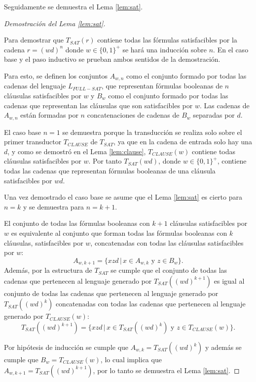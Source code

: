 Seguidamente se demuestra el Lema \ref{lem:sat}.

\begin{proof}[Demostración del Lema \ref{lem:sat}] \
    
    Para demostrar que $T_{SAT}(r)$ contiene todas las fórmulas satisfacibles por la cadena $r=(wd)^n$ donde $w\in\{0,1\}^+$ se hará una inducción sobre $n$. En el caso base y el paso inductivo
    se prueban ambos sentidos de la demostración.  
    
    Para esto, se definen los conjuntos $A_{w,n}$ como el conjunto formado por todas las cadenas del lenguaje $L_{FULL-SAT}$, que representan fórmulas booleanas de $n$ cláusulas satisfacibles por $w$ y $B_w$ como el conjunto formado por todas las cadenas que representan las cláusulas que son satisfacibles por $w$. Las cadenas de $A_{w,n}$ están formadas por $n$ concatenaciones de cadenas de $B_w$ separadas por $d$.
    
    El caso base $n=1$ se demuestra porque la transducción se realiza solo sobre el primer transductor $T_{CLAUSE}$ de $T_{SAT}$, ya que en la cadena de entrada solo hay una $d$, y como se demostró en el Lema \ref{lem:clause}, $T_{CLAUSE}(w)$ contiene todas cláusulas satisfacibles por $w$. Por tanto $T_{SAT}(wd)$, donde $w\in \{0,1\}^+$, contiene todas las cadenas que representan fórmulas booleanas de una cláusula satisfacibles por $wd$.
    
    Una vez demostrado el caso base se asume que el Lema \ref{lem:sat} es cierto para $n=k$ y se demuestra para $n=k+1$.
    
    El conjunto de todas las fórmulas booleanas con $k+1$ cláusulas satisfacibles por $w$ es equivalente al conjunto que forman todas las fórmulas booleanas con $k$ cláusulas, satisfacibles por $w$, concatenadas con todas las cláusulas satisfacibles por $w$: $$A_{w,k+1}=\{xzd\,|\,x\in A_{w,k} \text{ y } z\in B_w\}.$$ Además, por la estructura de $T_{SAT}$ se cumple que el conjunto de todas las cadenas que pertenecen al lenguaje generado por $T_{SAT}((wd)^{k+1})$ es igual al conjunto de todas las cadenas que pertenecen al lenguaje generado por $T_{SAT}((wd)^{k})$ concatenadas con todas las cadenas que pertenecen al lenguaje generado por $T_{CLAUSE}(w)$:
    $$T_{SAT}((wd)^{k+1})=\{xzd\,|\,x\in T_{SAT}((wd)^{k}) \text{ y } z\in T_{CLAUSE}(w)\}.$$
    
    Por hipótesis de inducción se cumple que $A_{w,k}=T_{SAT}((wd)^{k})$ y además se cumple que $B_w=T_{CLAUSE}(w)$, lo cual implica que $A_{w,k+1}=T_{SAT}((wd)^{k+1})$, por lo tanto se demuestra el Lema \ref{lem:sat}.
\end{proof}

